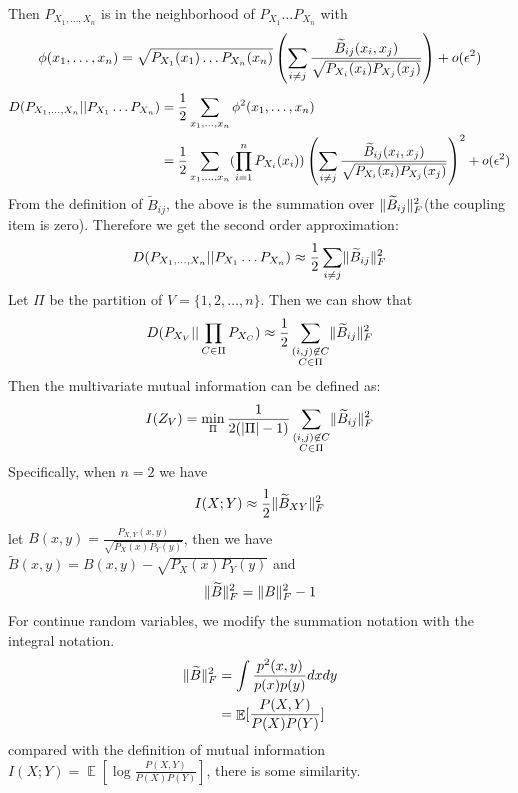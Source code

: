 \documentclass{article}
\DeclareMathOperator\E{\mathbb{E}}
\DeclarePairedDelimiter\abs{\lvert}{\rvert}
\DeclarePairedDelimiter\norm{\lVert}{\rVert}
\theoremstyle{definition}
\begin{document}
Then $P_{X_1,\dots, X_n}$ is in the neighborhood of $P_{X_1}\dots P_{X_n}$ with $$\phi(x_1,\dots, x_n)=
\sqrt{P_{X_1}(x_1)\dots P_{X_n}(x_n)}\left(\sum_{i\neq j}{\widetilde{B}_{ij}(x_i, x_j) \over \sqrt{P_{X_i}(x_i)P_{X_j}(x_j)} }\right)+o(\epsilon^2)$$
\begin{align*}
D(P_{X_1,\dots, X_n}|| P_{X_1}\dots P_{X_n}) & ={1 \over 2} \sum_{x_1,\dots,x_n}\phi^2(x_1,\dots, x_n) \\
& = {1\over 2}\sum_{x_1,\dots,x_n} (\prod_{i=1}^n  P_{X_i} (x_i)) \left(\sum_{i\neq j}{\widetilde{B}_{ij}(x_i, x_j) \over \sqrt{P_{X_i}(x_i)P_{X_j}(x_j)} }\right)^2 +o(\epsilon^2) 
\end{align*}
From the definition of $\widetilde{B}_{ij}$, the above is the summation over $\norm{\widetilde{B}_{ij}}^2_F$(the coupling item is zero). Therefore we get the second order approximation:
\begin{equation}
D(P_{X_1,\dots, X_n}|| P_{X_1}\dots P_{X_n}) \approx  {1 \over 2} \sum_{i\neq j} \norm{\widetilde{B}_{ij}}^2_F 
\end{equation}
Let $\Pi$ be the partition of $V=\{1,2,\dots, n\}$. Then we can show that 
\begin{equation}
D(P_{X_V} || \prod_{C\in \Pi} P_{X_{C}}) \approx {1 \over 2}\sum_{\substack{(i,j) \not\in C\\ C\in \Pi}} \norm{\widetilde{B}_{ij}}_F^2
\end{equation}
Then the multivariate mutual information can be defined as:
\begin{equation}
I(Z_V) = \min_{\Pi} {1 \over 2( \abs{\Pi} - 1) } \sum_{\substack{(i,j) \not\in C\\ C\in \Pi}} \norm{\widetilde{B}_{ij}}_F^2
\end{equation}
Specifically, when $n=2$ we have 
\begin{equation}
I(X;Y) \approx {1 \over 2} \norm{\widetilde{B}_{XY}}_F^2
\end{equation}
let $B(x,y)=\frac{P_{X,Y}(x,y)}{\sqrt{P_X(x)P_Y(y)}}$, then we have $\widetilde{B}(x,y)=B(x,y)-\sqrt{P_X(x)P_Y(y)}$ and 
\begin{equation}
\norm{\widetilde{B}}_F^2 = \norm{B}_F^2 -1
\end{equation}
For continue random variables, we modify the summation notation with the integral notation.
\begin{align}
\norm{\widetilde{B}}_F^2 & = \int \frac{p^2(x,y)}{p(x)p(y)} dx dy \\
& = \E[\frac{P(X,Y)}{P(X)P(Y)}]
\end{align}
compared with the definition of mutual information $I(X;Y) =  \E[\log \frac{P(X,Y)}{P(X)P(Y)}] $,
there is some similarity.
\end{document}
